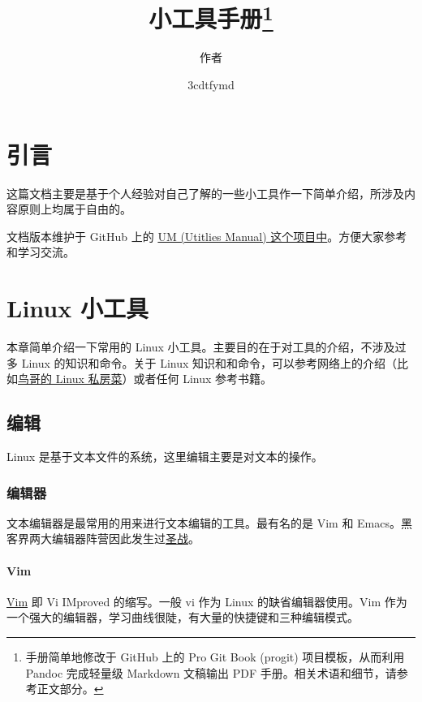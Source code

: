 \documentclass[a4paper,openany]{book}
\title{小工具手册}
\author{作者}
\title{\textbf{\savedtitle}\thanks{手册简单地修改于 GitHub 上的 Pro Git Book (progit) 项目模板，从而利用 Pandoc 完成轻量级 Markdown 文稿输出 PDF 手册。相关术语和细节，请参考正文部分。}}
\author{\textbf{\savedauthor}}
\date{\w3cdtfymd}
\makeatletter
\let\savedauthor=\@author
\let\savedtitle=\@title
\newcounter{tab}[chapter]
\newcommand{\chap}[1]{\newpage\thispagestyle{empty}\chapter{#1}\label{chap:\thechapter}}
\makeatother
\begin{document}
\frontmatter
\maketitle
\thispagestyle{empty}
\setcounter{tocdepth}{4}
\tableofcontents\newpage\thispagestyle{empty}

\mainmatter
\fancyhf{}
\fancyhead[LE]{{\small\leftmark}}
\fancyhead[RO]{{\small\rightmark}}
\fancyhead[RE,LO]{{\small\savedauthor\hspace*{1ex}\textbf{\savedtitle}}}
\fancyfoot[LE,RO]{\small\textbf\thepage}
\pagestyle{fancy}

\chap{引言}

这篇文档主要是基于个人经验对自己了解的一些小工具作一下简单介绍，所涉及内容原则上均属于自由的。

文档版本维护于 GitHub 上的 \href{https://www.github.com/GFrankenstein/UM}{UM (Utitlies Manual) 这个项目中}。方便大家参考和学习交流。

\chap{Linux 小工具}

本章简单介绍一下常用的 Linux 小工具。主要目的在于对工具的介绍，不涉及过多 Linux 的知识和命令。关于 Linux 知识和和命令，可以参考网络上的介绍（比如\href{http://linux.vbird.org}{鸟哥的 Linux 私房菜}）或者任何 Linux 参考书籍。

\section{编辑}

Linux 是基于文本文件的系统，这里编辑主要是对文本的操作。

\subsection{编辑器}

文本编辑器是最常用的用来进行文本编辑的工具。最有名的是 Vim 和 Emacs。黑客界两大编辑器阵营因此发生过\href{https://www.google.com.hk/search?newwindow=1\&safe=strict\&client=safari\&rls=en\&biw=1440\&bih=860\&q=\%E7\%BC\%96\%E8\%BE\%91\%E5\%99\%A8\%E5\%9C\%A3\%E6\%88\%98\&oq=\%E7\%BC\%96\%E8\%BE\%91\%E5\%99\%A8\%E5\%9C\%A3\&gs\_l=serp.3.0.0.1011885.1015094.0.1015961.11.11.0.0.0.0.215.846.6j1j1.8.0....0...1c.4.32.serp..4.7.776.I5mvHkV6OFk}{圣战}。

\subsubsection{Vim}

\href{http://www.vim.org}{Vim} 即 Vi IMproved 的缩写。一般 vi 作为 Linux 的缺省编辑器使用。Vim 作为一个强大的编辑器，学习曲线很陡，有大量的快捷键和三种编辑模式。
\end{document}
